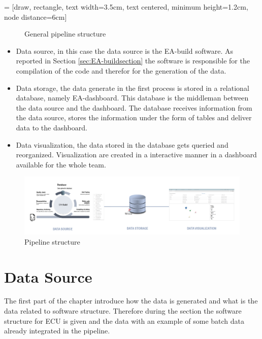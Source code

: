\documentclass[../main.tex]{subfiles}
\begin{document}
 = [draw, rectangle, text width=3.5cm, text centered, minimum height=1.2cm, node distance=6cm]
\begin{figure}[h]
  \centering
{}
  \caption{General pipeline structure}
  \label{pipelinestructure}
\end{figure}

\begin{itemize}
    \item Data source, in this case the data source is the EA-build software. As reported in Section \ref{sec:EA-buildsection} the software is responsible for the compilation of the code and therefor for the generation of the data. 
    \item Data storage, the data generate in the first process is stored in a relational database, namely EA-dashboard. This database is the middleman between the data source and the dashboard. The database receives information from the data source, stores the information under the form of tables and deliver data to the dashboard.
    \item Data visualization, the data stored in the database gets queried and reorganized. Visualization are created in a interactive manner in a dashboard available for the whole team.
\end{itemize}
\begin{figure}[h]
    \centering
    \includegraphics[width=\linewidth]{images_folder/pipeline_1.png}
    \caption{Pipeline structure}
    \label{fig:pipeline1}
\end{figure}
\section{Data Source}
The first part of the chapter introduce how the data is generated and what is the data related to software structure. Therefore during the section the software structure for \gls{ECU} is given and the data with an example of some batch data already integrated in the pipeline.
\end{document}
